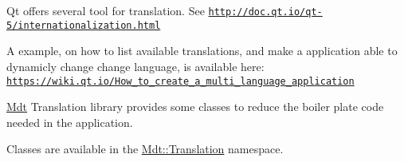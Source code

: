 Qt offers several tool for translation. See \href{http://doc.qt.io/qt-5/internationalization.html}{\tt http\+://doc.\+qt.\+io/qt-\/5/internationalization.\+html}

A example, on how to list available translations, and make a application able to dynamicly change change language, is available here\+: \href{https://wiki.qt.io/How_to_create_a_multi_language_application}{\tt https\+://wiki.\+qt.\+io/\+How\+\_\+to\+\_\+create\+\_\+a\+\_\+multi\+\_\+language\+\_\+application}

\hyperlink{namespace_mdt}{Mdt} Translation library provides some classes to reduce the boiler plate code needed in the application.

Classes are available in the \hyperlink{namespace_mdt_1_1_translation}{Mdt\+::\+Translation} namespace. 